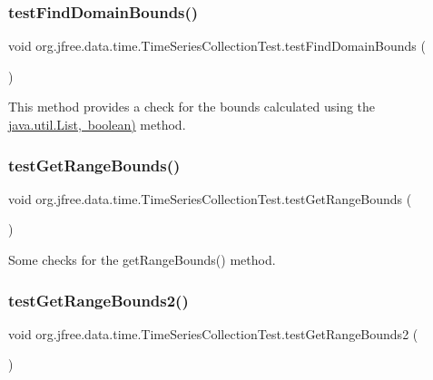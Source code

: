 \subsubsection{\texorpdfstring{test\+Find\+Domain\+Bounds()}{testFindDomainBounds()}}
{\footnotesize\ttfamily void org.\+jfree.\+data.\+time.\+Time\+Series\+Collection\+Test.\+test\+Find\+Domain\+Bounds (\begin{DoxyParamCaption}{ }\end{DoxyParamCaption})}

This method provides a check for the bounds calculated using the \mbox{\hyperlink{classorg_1_1jfree_1_1data_1_1general_1_1_dataset_utilities_aec9ad9fc9eeff78df3d1f9ad1b7c753e}{java.\+util.\+List, boolean)}} method. \mbox{\label{classorg_1_1jfree_1_1data_1_1time_1_1_time_series_collection_test_abc10e4c403c0d2c72c602680a79adb28}} 
\subsubsection{\texorpdfstring{test\+Get\+Range\+Bounds()}{testGetRangeBounds()}}
{\footnotesize\ttfamily void org.\+jfree.\+data.\+time.\+Time\+Series\+Collection\+Test.\+test\+Get\+Range\+Bounds (\begin{DoxyParamCaption}{ }\end{DoxyParamCaption})}

Some checks for the get\+Range\+Bounds() method. \mbox{\label{classorg_1_1jfree_1_1data_1_1time_1_1_time_series_collection_test_adeaf1f09cf70b5f1ca4fdd52c24c792c}} 
\subsubsection{\texorpdfstring{test\+Get\+Range\+Bounds2()}{testGetRangeBounds2()}}
{\footnotesize\ttfamily void org.\+jfree.\+data.\+time.\+Time\+Series\+Collection\+Test.\+test\+Get\+Range\+Bounds2 (\begin{DoxyParamCaption}{ }\end{DoxyParamCaption})}

